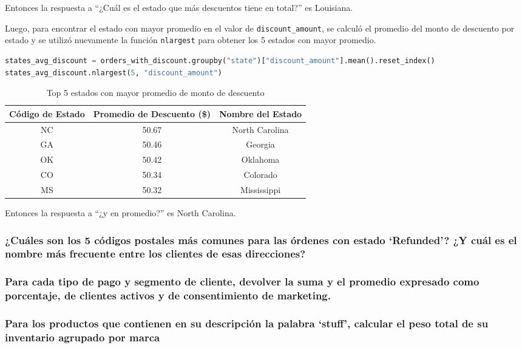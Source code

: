 Entonces la respuesta a ``¿Cuál es el estado que más descuentos tiene en total?'' es Louisiana.

Luego, para encontrar el estado con mayor promedio en el valor de \texttt{discount\_amount}, se calculó el promedio del monto de descuento por estado y se utilizó nuevamente la función \texttt{nlargest} para obtener los 5 estados con mayor promedio.

\begin{lstlisting}[language=Python, xleftmargin=26pt, xrightmargin=26pt]
states_avg_discount = orders_with_discount.groupby("state")["discount_amount"].mean().reset_index()
states_avg_discount.nlargest(5, "discount_amount")
\end{lstlisting}

\begin{table}[H]
\centering
\begin{tabular}{|c|c|c|}
\hline
\textbf{Código de Estado} & \textbf{Promedio de Descuento (\$)} & \textbf{Nombre del Estado} \\
\hline
NC & 50.67 & North Carolina \\
GA & 50.46 & Georgia \\
OK & 50.42 & Oklahoma \\
CO & 50.34 & Colorado \\
MS & 50.32 & Mississippi \\
\hline
\end{tabular}
\caption{Top 5 estados con mayor promedio de monto de descuento}
\end{table}

Entonces la respuesta a ``¿y en promedio?'' es North Carolina.

\subsubsection{¿Cuáles son los 5 códigos postales más comunes para las órdenes con estado `Refunded'? ¿Y cuál es el nombre más frecuente entre los clientes de esas direcciones?}

\subsubsection{Para cada tipo de pago y segmento de cliente, devolver la suma y el promedio expresado como porcentaje, de clientes activos y de consentimiento de marketing.}

\subsubsection{Para los productos que contienen en su descripción la palabra `stuff', calcular el peso total de su inventario agrupado por marca}